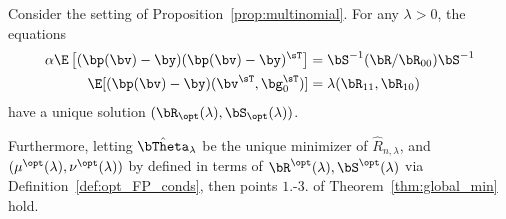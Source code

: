 \begin{lemma}
\label{lemma:multinomial_regularized}
Consider the setting of Proposition~\ref{prop:multinomial}.
For any $\lambda >0$, the equations 
\begin{align}
\label{eq:multinomial_FP_regularized}
   \alpha \E\left[(\bp(\bv) - \by)(\bp(\bv) - \by)^\sT\right]  &= \bS^{-1} (\bR/\bR_{00}) \bS^{-1}\\
  \E[(\bp(\bv) - \by) (\bv^\sT,\bg_0^\sT)]  &= \lambda (\bR_{11},\bR_{10})
\end{align}
have a unique solution $(\bR_{\opt}(\lambda),\bS_{\opt}(\lambda))$.

Furthermore, letting $\hat\bTheta_\lambda$ be the unique minimizer of $\hat R_{n,\lambda}$, and $(\mu^\opt(\lambda),\nu^\opt(\lambda))$ by defined in terms of $\bR^\opt(\lambda),\bS^\opt(\lambda)$ via Definition~\ref{def:opt_FP_conds},
then points $\textit{1.-3.}$ of Theorem~\ref{thm:global_min} hold.
\end{lemma}
